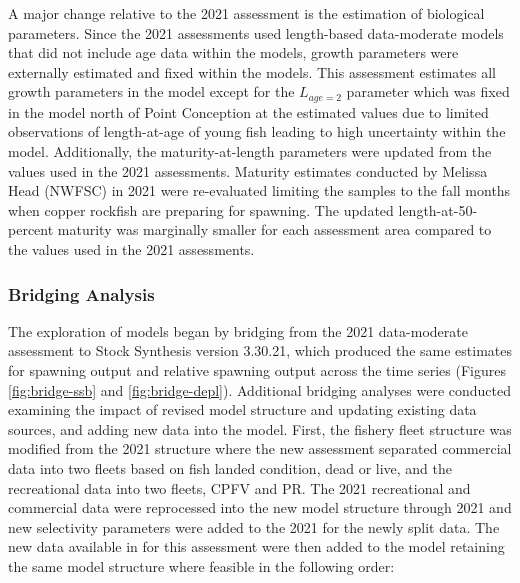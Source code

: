 \documentclass[11pt,
  english,
  letterpaper,
]{article}
\begin{document}
A major change relative to the 2021 assessment is the estimation of biological parameters. Since the 2021 assessments used length-based data-moderate models that did not include age data within the models, growth parameters were externally estimated and fixed within the models. This assessment estimates all growth parameters in the model except for the \(L_{age=2}\) parameter which was fixed in the model north of Point Conception at the estimated values due to limited observations of length-at-age of young fish leading to high uncertainty within the model. Additionally, the maturity-at-length parameters were updated from the values used in the 2021 assessments. Maturity estimates conducted by Melissa Head (NWFSC) in 2021 were re-evaluated limiting the samples to the fall months when copper rockfish are preparing for spawning. The updated length-at-50-percent maturity was marginally smaller for each assessment area compared to the values used in the 2021 assessments.

\hypertarget{bridging-analysis}{%
\subsubsection{Bridging Analysis}\label{bridging-analysis}}

The exploration of models began by bridging from the 2021 data-moderate assessment to Stock Synthesis version 3.30.21, which produced the same estimates for spawning output and relative spawning output across the time series (Figures \ref{fig:bridge-ssb} and \ref{fig:bridge-depl}). Additional bridging analyses were conducted examining the impact of revised model structure and updating existing data sources, and adding new data into the model. First, the fishery fleet structure was modified from the 2021 structure where the new assessment separated commercial data into two fleets based on fish landed condition, dead or live, and the recreational data into two fleets, CPFV and PR. The 2021 recreational and commercial data were reprocessed into the new model structure through 2021 and new selectivity parameters were added to the 2021 for the newly split data. The new data available in for this assessment were then added to the model retaining the same model structure where feasible in the following order:
\end{document}

